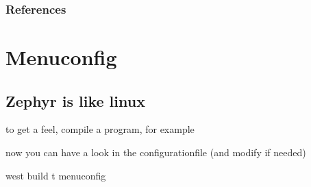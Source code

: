 \documentclass[letterpaper,10pt,english]{sphinxmanual}
\begin{document}
\subsection{References}
\label{\detokenize{samples/samplestimerREADME:references}}

\chapter{Menuconfig}
\label{\detokenize{menuconfig:menuconfig}}\label{\detokenize{menuconfig::doc}}

\section{Zephyr is like linux}
\label{\detokenize{menuconfig:zephyr-is-like-linux}}

  to get a feel, compile a program, for example

\begin{sphinxVerbatim}[commandchars=\\\{\}]
\end{sphinxVerbatim}

now you can have a look in the configurationfile (and modify if needed)

\begin{sphinxVerbatim}[commandchars=\\\{\}]
 west build \PYGZhy{}t menuconfig
\end{sphinxVerbatim}
\end{document}
